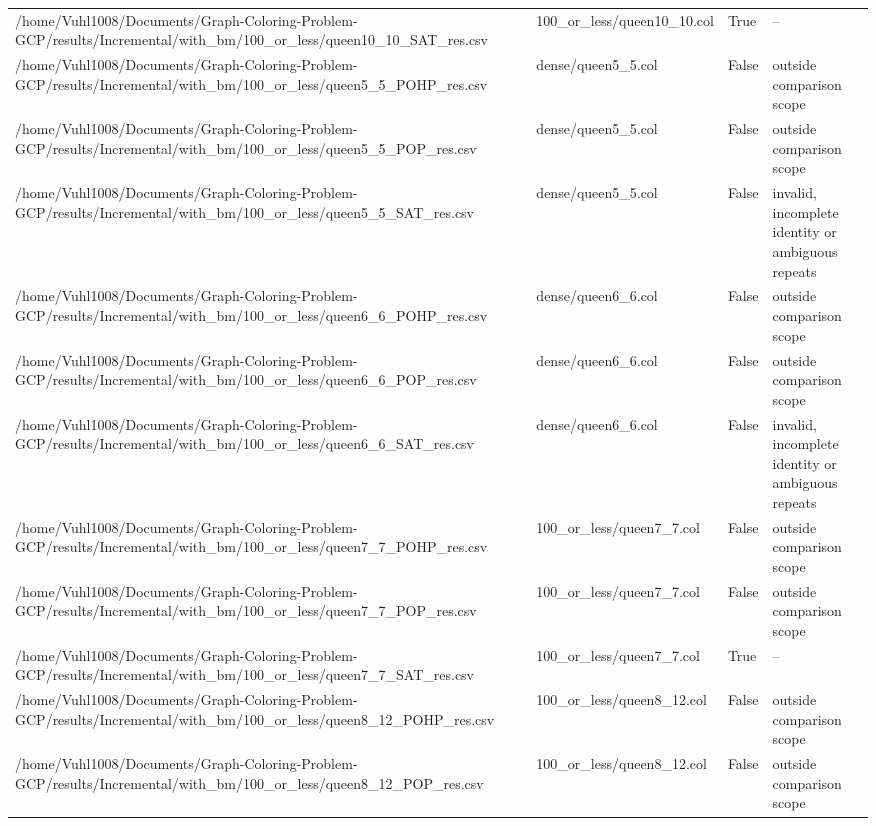 \begin{table}[htbp]
\begin{tabular}{llll}
/home/Vuhl1008/Documents/Graph-Coloring-Problem-GCP/results/Incremental/with\_bm/100\_or\_less/queen10\_10\_SAT\_res.csv & 100\_or\_less/queen10\_10.col & True & -- \\
/home/Vuhl1008/Documents/Graph-Coloring-Problem-GCP/results/Incremental/with\_bm/100\_or\_less/queen5\_5\_POHP\_res.csv & dense/queen5\_5.col & False & outside comparison scope \\
/home/Vuhl1008/Documents/Graph-Coloring-Problem-GCP/results/Incremental/with\_bm/100\_or\_less/queen5\_5\_POP\_res.csv & dense/queen5\_5.col & False & outside comparison scope \\
/home/Vuhl1008/Documents/Graph-Coloring-Problem-GCP/results/Incremental/with\_bm/100\_or\_less/queen5\_5\_SAT\_res.csv & dense/queen5\_5.col & False & invalid, incomplete identity or ambiguous repeats \\
/home/Vuhl1008/Documents/Graph-Coloring-Problem-GCP/results/Incremental/with\_bm/100\_or\_less/queen6\_6\_POHP\_res.csv & dense/queen6\_6.col & False & outside comparison scope \\
/home/Vuhl1008/Documents/Graph-Coloring-Problem-GCP/results/Incremental/with\_bm/100\_or\_less/queen6\_6\_POP\_res.csv & dense/queen6\_6.col & False & outside comparison scope \\
/home/Vuhl1008/Documents/Graph-Coloring-Problem-GCP/results/Incremental/with\_bm/100\_or\_less/queen6\_6\_SAT\_res.csv & dense/queen6\_6.col & False & invalid, incomplete identity or ambiguous repeats \\
/home/Vuhl1008/Documents/Graph-Coloring-Problem-GCP/results/Incremental/with\_bm/100\_or\_less/queen7\_7\_POHP\_res.csv & 100\_or\_less/queen7\_7.col & False & outside comparison scope \\
/home/Vuhl1008/Documents/Graph-Coloring-Problem-GCP/results/Incremental/with\_bm/100\_or\_less/queen7\_7\_POP\_res.csv & 100\_or\_less/queen7\_7.col & False & outside comparison scope \\
/home/Vuhl1008/Documents/Graph-Coloring-Problem-GCP/results/Incremental/with\_bm/100\_or\_less/queen7\_7\_SAT\_res.csv & 100\_or\_less/queen7\_7.col & True & -- \\
/home/Vuhl1008/Documents/Graph-Coloring-Problem-GCP/results/Incremental/with\_bm/100\_or\_less/queen8\_12\_POHP\_res.csv & 100\_or\_less/queen8\_12.col & False & outside comparison scope \\
/home/Vuhl1008/Documents/Graph-Coloring-Problem-GCP/results/Incremental/with\_bm/100\_or\_less/queen8\_12\_POP\_res.csv & 100\_or\_less/queen8\_12.col & False & outside comparison scope \\

\end{tabular}
\end{table}
